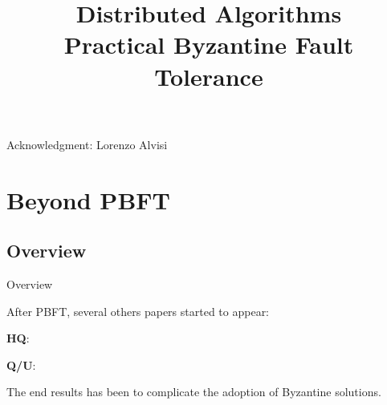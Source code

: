 
\title[DS - BFT]{\textbf{Distributed Algorithms}\\Practical Byzantine Fault Tolerance}


\newcommand{\Retreat}{\textsc{retreat}}

\newcommand{\Request}{\textsc{request}}
\newcommand{\Preprepare}{\textsc{pre-prepare}}
\newcommand{\Prepare}{\textsc{prepare}}
\newcommand{\Commit}{\textsc{commit}}
\newcommand{\Reply}{\textsc{commit}}
\newcommand{\Checkpoint}{\textsc{checkpoint}}
\newcommand{\ViewChange}{\textsc{view-change}}
\newcommand{\NewView}{\textsc{new-view}}

\newcommand{\Prepared}{\mathbf{prepared}}
\newcommand{\Committed}{\mathbf{committed}}








\begin{frame}
\titlepage

{\footnotesize
Acknowledgment: Lorenzo Alvisi
}


\end{frame}




\section{Beyond PBFT}

\subsection{Overview}

\begin{frame}{Overview}
	
After PBFT, several others papers started to appear:
\BIL
\item \textbf{HQ}: 
\item \textbf{Q/U}: 
\EIL

The end results has been to complicate the adoption of Byzantine solutions.

\end{frame}

